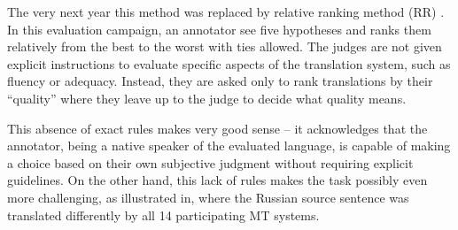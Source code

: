 The very next year this method was replaced by relative ranking method (RR) \citep{callison-burch-etal-2007-meta}. In this evaluation campaign, an annotator see five hypotheses and ranks them relatively from the best to the worst with ties allowed. The judges are not given explicit instructions to evaluate specific aspects of the translation system, such as fluency or adequacy. Instead, they are asked only to rank translations by their “quality” where they leave up to the judge to decide what quality means.


This absence of exact rules makes very good sense -- it acknowledges that the annotator, being a native speaker of the evaluated language,  is capable of making a choice based on their own subjective judgment without requiring explicit guidelines. On the other hand, this lack of rules makes the task possibly even more challenging, as illustrated in, where the Russian source sentence was translated differently by all 14 participating MT systems.

